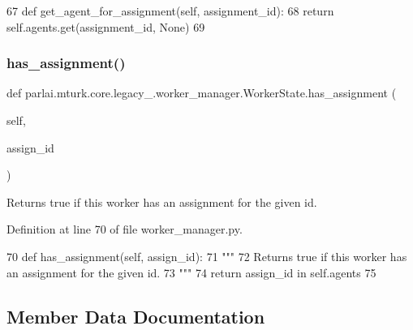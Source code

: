 \begin{DoxyCode}
67     \textcolor{keyword}{def }get\_agent\_for\_assignment(self, assignment\_id):
68         \textcolor{keywordflow}{return} self.agents.get(assignment\_id, \textcolor{keywordtype}{None})
69 
\end{DoxyCode}
\mbox{\label{classparlai_1_1mturk_1_1core_1_1legacy__2018_1_1worker__manager_1_1WorkerState_a71a385a16ef2f33d32cde9050350580c}} 
\subsubsection{\texorpdfstring{has\+\_\+assignment()}{has\_assignment()}}
{\footnotesize\ttfamily def parlai.\+mturk.\+core.\+legacy\+\_.\+worker\+\_\+manager.\+Worker\+State.\+has\+\_\+assignment (\begin{DoxyParamCaption}\item[{}]{self,  }\item[{}]{assign\+\_\+id }\end{DoxyParamCaption})}

\begin{DoxyVerb}Returns true if this worker has an assignment for the given id.
\end{DoxyVerb}
 

Definition at line 70 of file worker\+\_\+manager.\+py.


\begin{DoxyCode}
70     \textcolor{keyword}{def }has\_assignment(self, assign\_id):
71         \textcolor{stringliteral}{"""}
72 \textcolor{stringliteral}{        Returns true if this worker has an assignment for the given id.}
73 \textcolor{stringliteral}{        """}
74         \textcolor{keywordflow}{return} assign\_id \textcolor{keywordflow}{in} self.agents
75 
\end{DoxyCode}


\subsection{Member Data Documentation}
\mbox{\label{classparlai_1_1mturk_1_1core_1_1legacy__2018_1_1worker__manager_1_1WorkerState_a4165b5a0b9ffcbd8194fd10adeb02fdb}} 
